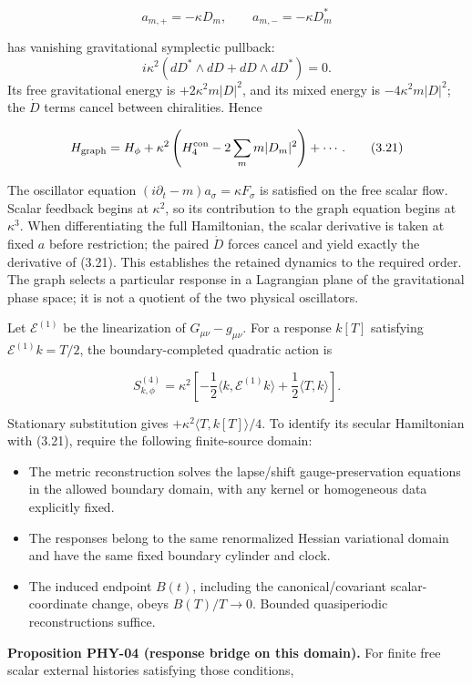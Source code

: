 \[
a_{m,+}=-\kappa D_m,\qquad a_{m,-}=-\kappa D_m^*
\tag{3.20}
\]

has vanishing gravitational symplectic pullback: \[
i\kappa^2(dD^*\wedge dD+dD\wedge dD^*)=0 .
\] Its free gravitational energy is \(+2\kappa^2m|D|^2\), and its mixed energy is \(-4\kappa^2m|D|^2\); the \(\dot D\) terms cancel between chiralities. Hence

\[
H_{\rm graph}
=H_\phi+\kappa^2\left(H_4^{\rm con}
-2\sum_m m|D_m|^2\right)+\cdots .
\tag{3.21}
\]

The oscillator equation \((i\partial_t-m)a_\sigma=\kappa F_\sigma\) is satisfied on the free scalar flow. Scalar feedback begins at \(\kappa^2\), so its contribution to the graph equation begins at \(\kappa^3\). When differentiating the full Hamiltonian, the scalar derivative is taken at fixed \(a\) before restriction; the paired \(\dot D\) forces cancel and yield exactly the derivative of (3.21). This establishes the retained dynamics to the required order. The graph selects a particular response in a Lagrangian plane of the gravitational phase space; it is not a quotient of the two physical oscillators.

Let \(\mathcal E^{(1)}\) be the linearization of \(G_{\mu\nu}-g_{\mu\nu}\). For a response \(k[T]\) satisfying \(\mathcal E^{(1)}k=T/2\), the boundary-completed quadratic action is

\[
S^{(4)}_{k,\phi}
=\kappa^2\left[-\frac12\langle k,\mathcal E^{(1)}k\rangle
+\frac12\langle T,k\rangle\right].
\tag{3.22}
\]

Stationary substitution gives \(+\kappa^2\langle T,k[T]\rangle/4\). To identify its secular Hamiltonian with (3.21), require the following finite-source domain:

\begin{itemize}
\tightlist
\item
  The metric reconstruction solves the lapse/shift gauge-preservation equations in the allowed boundary domain, with any kernel or homogeneous data explicitly fixed.
\item
  The responses belong to the same renormalized Hessian variational domain and have the same fixed boundary cylinder and clock.
\item
  The induced endpoint \(B(t)\), including the canonical/covariant scalar-coordinate change, obeys \(B(T)/T\to0\). Bounded quasiperiodic reconstructions suffice.
\end{itemize}

\textbf{Proposition PHY-04 (response bridge on this domain).} For finite free scalar external histories satisfying those conditions,


